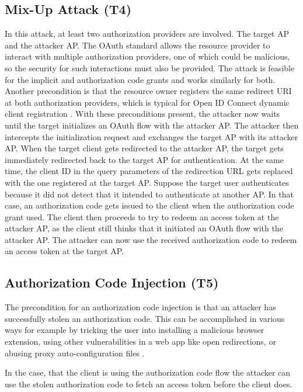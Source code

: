 \documentclass[
    fontsize=12pt,
    headings=small,
    parskip=half,           %
    bibliography=totoc,
    numbers=noenddot,       %
    open=any,               %
    ]{scrreprt}
\begin{document}
\subsection[Mix-Up Attack]{Mix-Up Attack (T4)}
\label{threat:T4}
In this attack, at least two authorization providers are involved. The target AP and the attacker AP. The OAuth standard allows the resource provider to interact with multiple authorization providers, one of which could be malicious, so the security for such interactions must also be provided. The attack is feasible for the implicit and authorization code grants and works similarly for both. Another precondition is that the resource owner registers the same redirect URI at both authorization providers, which is typical for Open ID Connect dynamic client registration \cite{hosseyni2023formal}. With these preconditions present, the attacker now waits until the target initializes an OAuth flow with the attacker AP. The attacker then intercepts the initialization request and exchanges the target AP with its attacker AP. When the target client gets redirected to the attacker AP, the target gets immediately redirected back to the target AP for authentication. At the same time, the client ID in the query parameters of the redirection URL gets replaced with the one registered at the target AP. Suppose the target user authenticates because it did not detect that it intended to authenticate at another AP. In that case, an authorization code gets issued to the client when the authorization code grant used. The client then proceeds to try to redeem an access token at the attacker AP, as the client still thinks that it initiated an OAuth flow with the attacker AP. The attacker can now use the received authorization code to redeem an access token at the target AP. \cite{fett2016comprehensive}

\subsection[Authorization Code Injection]{Authorization Code Injection (T5)}
\label{threat:T5} 
The precondition for an authorization code injection is that an attacker has
successfully stolen an authorization code. This can be accomplished in various
ways for example by tricking the user into installing a malicious browser
extension, using other vulnerabilities in a web app like open redirections, or
abusing proxy auto-configuration files \cite*{philippaerts2022oauch}.

In the case, that the client is using the authorization code flow the attacker
can use the stolen authorization code to fetch an access token before the
client does.
\end{document}
